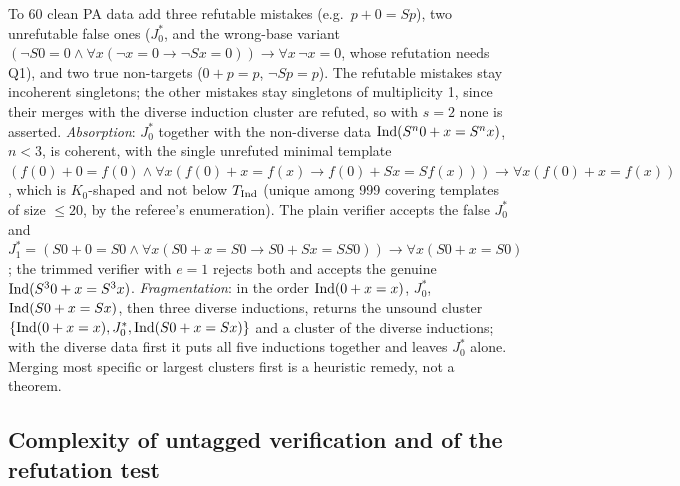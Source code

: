 \begin{example}[noisy PA]\label{ex:many:noise}
To 60 clean PA data add three refutable mistakes (e.g.\ $p+0=Sp$), two unrefutable false ones ($J^*_0$, and the wrong-base
variant $(\neg S0=0\wedge\forall x(\neg x=0\to\neg Sx=0))\to\forall x\,\neg x=0$, whose refutation needs Q1), and two true
non-targets ($0+p=p$, $\neg Sp=p$). The refutable mistakes stay incoherent singletons; the other mistakes stay singletons of
multiplicity 1, since their merges with the diverse induction cluster are refuted, so with $s=2$ none is asserted.
\emph{Absorption}: $J^*_0$ together with the non-diverse data $\mathrm{Ind}(S^n0+x=S^nx)$, $n<3$, is coherent, with the single
unrefuted minimal template $(f(0)+0=f(0)\wedge\forall x(f(0)+x=f(x)\to f(0)+Sx=Sf(x)))\to\forall x(f(0)+x=f(x))$, which is
$K_0$-shaped and not below $T_{\mathrm{Ind}}$ (unique among 999 covering templates of size $\le20$, by the referee's enumeration).
The plain verifier accepts the false $J^*_0$ and $J^*_1=(S0+0=S0\wedge\forall x(S0+x=S0\to S0+Sx=SS0))\to\forall x(S0+x=S0)$;
the trimmed verifier with $e=1$ rejects both and accepts the genuine $\mathrm{Ind}(S^30+x=S^3x)$. \emph{Fragmentation}: in the order
$\mathrm{Ind}(0+x=x)$, $J^*_0$, $\mathrm{Ind}(S0+x=Sx)$, then three diverse inductions, \DTRC{} returns the unsound cluster
$\{\mathrm{Ind}(0+x=x),J^*_0,\mathrm{Ind}(S0+x=Sx)\}$ and a cluster of the diverse inductions; with the diverse data first it puts all five
inductions together and leaves $J^*_0$ alone. Merging most specific or largest clusters first is a heuristic remedy, not a
theorem.
\end{example}

\subsection{Complexity of untagged verification and of the refutation test}\label{app:many:cost}

